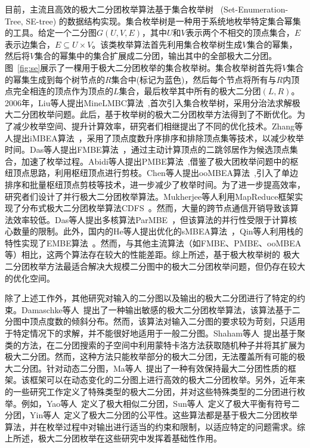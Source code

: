 目前，主流且高效的极大二分团枚举算法基于集合枚举树~\cite{SEtree92} (Set-Enumeration-Tree, SE-tree) 的数据结构实现。集合枚举树是一种用于系统地枚举特定集合幂集的工具。给定一个二分图$G(U, V, E)$，其中$U$和$V$表示两个不相交的顶点集合，$E$表示边集合，$E \subseteq U \times V$。该类枚举算法首先利用集合枚举树生成$V$集合的幂集，然后将$V$集合的幂集中的集合扩展成二分团，输出其中的全部极大二分团。图~\ref{fig:se}展示了一棵用于极大二分团枚举的集合枚举树。集合枚举树首先将$V$集合的幂集生成到每个树节点的$R$集合中(标记为蓝色)，然后每个节点将所有与$R$内顶点完全相连的顶点作为顶点的$L$集合，最后枚举其中所有的极大二分团$(L,R)$。2006年，Liu等人提出MineLMBC算法~\cite{minel06},首次引入集合枚举树，采用分治法求解极大二分团枚举问题。此后，基于枚举树的极大二分团枚举方法得到了不断优化。为了减少枚举空间、提升计算效率，研究者们相继提出了不同的优化技术。Zhang等人提出iMBEA算法~\cite{iMBEA14}，采用了顶点度数升序排序和排除顶点集等技术，以减少枚举时间。Das等人提出FMBE算法~\cite{parMBE18}，通过主动计算顶点的二跳邻居作为候选顶点集合，加速了枚举过程。Abidi等人提出PMBE算法~\cite{PMBE20},借鉴了极大团枚举问题中的枢纽顶点思路，利用枢纽顶点进行剪枝。Chen等人提出ooMBEA算法~\cite{ooMBE22},引入了单边排序和批量枢纽顶点剪枝等技术，进一步减少了枚举时间。为了进一步提高效率，研究者们设计了并行极大二分团枚举算法。Mukherjee等人利用MapReduce框架实现了分布式极大二分团枚举算法CDFS~\cite{mapreduceMBE16}。然而，大量的跨节点通信开销导致该算法效率较低。Das等人提出多核算法ParMBE~\cite{parMBE18}，但该算法的并行性受限于计算核心数量的限制。此外，国内的He等人提出优化的sMBEA算法~\cite{MBEHe18}，Qin等人利用栈的特性实现了EMBE算法~\cite{MBEQin20}。然而，与其他主流算法（如FMBE、PMBE、ooMBEA等）相比，这两个算法存在较大的性能差距。综上所述，基于极大枚举树的
极大二分团枚举方法最适合解决大规模二分图中的极大二分团枚举问题，但仍存在较大的优化空间。

除了上述工作外，其他研究对输入的二分图以及输出的极大二分团进行了特定的约束。Damaschke等人~\cite{Damaschke14}提出了一种输出敏感的极大二分团枚举算法，该算法基于二分图中顶点度数的倾斜分布。然而，该算法对输入二分图的要求较为苛刻，只适用于特定情况下的求解，并不能很好地适用于一般二分图。Shaham等人~\cite{Shaham16}提出基于聚类的方法，在二分团搜索的子空间中利用蒙特卡洛方法获取随机种子并将其扩展为极大二分团。然而，这种方法只能枚举部分的极大二分团，无法覆盖所有可能的极大二分团。针对动态二分图，Ma等人~\cite{Ma22}提出了一种有效保持最大二分团性质的框架。该框架可以在动态变化的二分图上进行高效的极大二分团枚举。另外，近年来的一些研究工作定义了特殊类型的极大二分团，并对这些特殊类型的二分团进行枚举。例如，Yao等人~\cite{SimilarMBE22}定义了极大相似二分团，Sun等人~\cite{Sun22}定义了极大平衡有符号二分团，Yin等人~\cite{FairMBE23}定义了极大二分团的公平性。这些算法都是基于极大二分团枚举算法，并在枚举过程中对输出进行适当的约束和限制，以适应特定的问题需求。综上所述，极大二分团枚举在这些研究中发挥着基础性作用。


